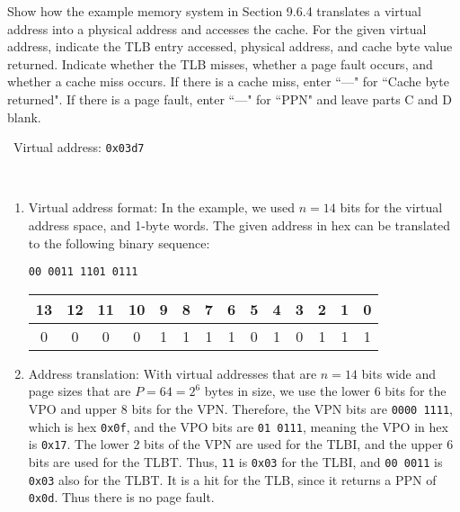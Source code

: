 \documentclass[12pt]{article}
\newenvironment{ex}[2][Exercise]{\begin{trivlist}
		\item[\hskip \labelsep {\bfseries #1}\hskip \labelsep {\bfseries #2.}]}{\end{trivlist}}
\newenvironment{sol}[1][Solution]{\begin{trivlist}
		\item[\hskip \labelsep {\bfseries #1:}]}{\end{trivlist}}
\begin{document}
\begin{ex}{9.4}
	Show how the example memory system in Section 9.6.4 translates a virtual address into a physical
	address and accesses the cache. For the given virtual address, indicate the TLB entry accessed,
	physical address, and cache byte value returned. Indicate whether the TLB misses, whether a page
	fault occurs, and whether a cache miss occurs. If there is a cache miss, enter ``---" for
	``Cache byte returned". If there is a page fault, enter ``---" for ``PPN" and leave parts C
	and D blank.
	
	\
	Virtual address: \texttt{0x03d7}
\end{ex}

\begin{sol}
	\
	\begin{enumerate}[label=(\alph*)]
		\item Virtual address format: In the example, we used $n=14$ bits for the virtual address space,
		and 1-byte words. The given address in hex can be translated to the following binary sequence:
		\begin{center}
			\texttt{00 0011 1101 0111}
		\end{center}
		\begin{center}
			\begin{tabular}{|c|c|c|c|c|c|c|c|c|c|c|c|c|c|}
				13 & 12 & 11 & 10 & 9 & 8 & 7 & 6 & 5 & 4 & 3 & 2 & 1 & 0\\
				\hline
				0 & 0 & 0 & 0 & 1 & 1 & 1 & 1 & 0 & 1 & 0 & 1 & 1 & 1 \\
				\hline
			\end{tabular}
		\end{center}
		\item Address translation: With virtual addresses that are $n=14$ bits wide and page
		sizes that are $P=64=2^{6}$ bytes in size, we use the lower $6$ bits for the VPO
		and upper 8 bits for the VPN. Therefore, the VPN bits are \texttt{0000 1111}, which
		is hex \texttt{0x0f}, and the VPO bits are \texttt{01 0111}, meaning the VPO in hex
		is \texttt{0x17}. The lower 2 bits of the VPN are used for the TLBI, and the
		upper 6 bits are used for the TLBT. Thus, \texttt{11} is \texttt{0x03} for the TLBI,
		and \texttt{00 0011} is \texttt{0x03} also for the TLBT. It is a hit for the TLB,
		since it returns a PPN of \texttt{0x0d}. Thus there is no page fault.
		

\end{enumerate}
\end{sol}
\end{document}
